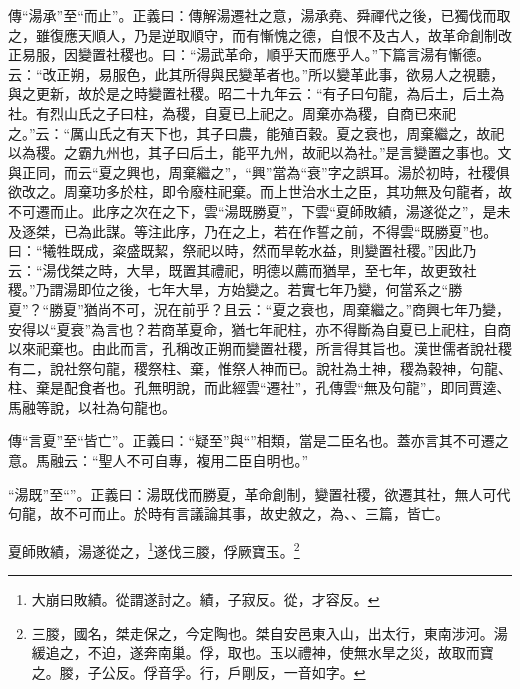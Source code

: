 {\noindent\zhuan{}\fzbyks 傳“湯承”至“而止”。正義曰：傳解湯遷社之意，湯承堯、舜禪代之後，已獨伐而取之，雖復應天順人，乃是逆取順守，而有慚愧之德，自恨不及古人，故革命創制改正易服，因變置社稷也。曰：“湯武革命，順乎天而應乎人。”下篇言湯有慚德。云：“改正朔，易服色，此其所得與民變革者也。”所以變革此事，欲易人之視聽，與之更新，故於是之時變置社稷。昭二十九年云：“有子曰句龍，為后土，后土為社。有烈山氏之子曰柱，為稷，自夏已上祀之。周棄亦為稷，自商已來祀之。”云：“厲山氏之有天下也，其子曰農，能殖百穀。夏之衰也，周棄繼之，故祀以為稷。之霸九州也，其子曰后土，能平九州，故祀以為社。”是言變置之事也。文與正同，而云“夏之興也，周棄繼之”，“興”當為“衰”字之誤耳。湯於初時，社稷俱欲改之。周棄功多於柱，即令廢柱祀棄。而上世治水土之臣，其功無及句龍者，故不可遷而止。此序之次在之下，雲“湯既勝夏”，下雲“夏師敗績，湯遂從之”，是未及逐桀，已為此謀。等注此序，乃在之上，若在作誓之前，不得雲“既勝夏”也。曰：“犧牲既成，粢盛既絜，祭祀以時，然而旱乾水益，則變置社稷。”因此乃云：“湯伐桀之時，大旱，既置其禮祀，明德以薦而猶旱，至七年，故更致社稷。”乃謂湯即位之後，七年大旱，方始變之。若實七年乃變，何當系之“勝夏”？“勝夏”猶尚不可，況在前乎？且云：“夏之衰也，周棄繼之。”商興七年乃變，安得以“夏衰”為言也？若商革夏命，猶七年祀柱，亦不得斷為自夏已上祀柱，自商以來祀棄也。由此而言，孔稱改正朔而變置社稷，所言得其旨也。漢世儒者說社稷有二，說社祭句龍，稷祭柱、棄，惟祭人神而已。說社為土神，稷為穀神，句龍、柱、棄是配食者也。孔無明說，而此經雲“遷社”，孔傳雲“無及句龍”，即同賈逵、馬融等說，以社為句龍也。 \par}

{\noindent\zhuan{}\fzbyks 傳“言夏”至“皆亡”。正義曰：“疑至”與“”相類，當是二臣名也。蓋亦言其不可遷之意。馬融云：“聖人不可自專，複用二臣自明也。” \par}

{\noindent\shu{}\fzkt “湯既”至“”。正義曰：湯既伐而勝夏，革命創制，變置社稷，欲遷其社，無人可代句龍，故不可而止。於時有言議論其事，故史敘之，為、、三篇，皆亡。 \par}

夏師敗績，湯遂從之，\footnote{大崩曰敗績。從謂遂討之。績，子寂反。從，才容反。}遂伐三朡，俘厥寶玉。\footnote{三朡，國名，桀走保之，今定陶也。桀自安邑東入山，出太行，東南涉河。湯緩追之，不迫，遂奔南巢。俘，取也。玉以禮神，使無水旱之災，故取而寶之。朡，子公反。俘音孚。行，戶剛反，一音如字。}

